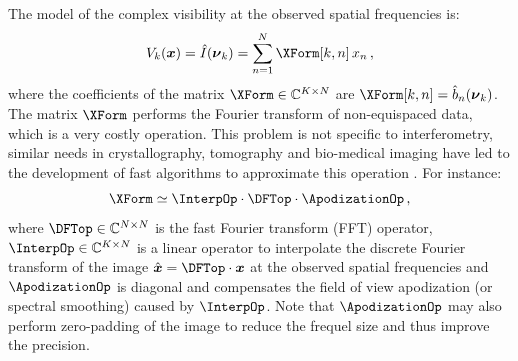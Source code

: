 \documentclass{article}
\newcommand{\V}[1]{\boldsymbol{#1}}      %
\newcommand{\FT}[1]{\hat{#1}}            %
\newcommand{\Complexes}{\mathbb{C}}
\newcommand{\ComplexVis}{V}
\newcommand{\Freq}{\nu}               %
\newcommand{\VFreq}{\V{\Freq}}
\newcommand{\Image}{I}
\newcommand{\Param}{x}
\newcommand{\VParam}{\V{\Param}}
\newcommand{\BasisFunc}{b}
\begin{document}
The model of the complex visibility at the observed spatial frequencies is:
\begin{equation}
  \label{eq:sampled-image-FT}
  \ComplexVis_{k}(\VParam) = \FT{\Image}(\VFreq_k)
  = \sum_{n=1}^{N} \XForm[k,n] \, \Param_{n}
  \,,
\end{equation}
where the coefficients of the matrix $\XForm\in\Complexes^{K\times{}N}$ are
$\XForm[k,n] = \FT{\BasisFunc}_n(\VFreq_k)$.  The matrix $\XForm$ performs the
Fourier transform of non-equispaced data, which is a very costly operation.
This problem is not specific to interferometry, similar needs in
crystallography, tomography and bio-medical imaging have led to the
development of fast algorithms to approximate this operation
\citep{Potts_et_al-2001-NFFT_tutorial}.  For instance:
\begin{equation}
  \label{eq:Fourier-approximation}
  \XForm \simeq \InterpOp\cdot\DFTop\cdot\ApodizationOp \, ,
\end{equation}
where $\DFTop\in\Complexes^{N\times{}N}$ is the fast Fourier transform (FFT)
operator, $\InterpOp\in\Complexes^{K\times{}N}$ is a linear operator to
interpolate the discrete Fourier transform of the image
$\FT{\VParam}=\DFTop\cdot\VParam$ at the observed spatial frequencies and
$\ApodizationOp$ is diagonal and compensates the field of view apodization (or
spectral smoothing) caused by $\InterpOp$.  Note that $\ApodizationOp$ may
also perform zero-padding of the image to reduce the frequel size and thus
improve the precision.

\end{document}
